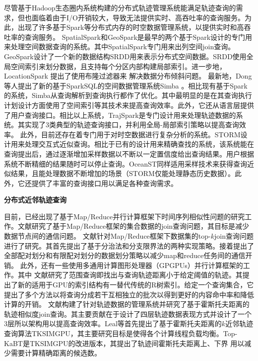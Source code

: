 尽管基于Hadoop生态圈内系统构建的分布式轨迹管理系统能满足轨迹查询的需求，但也面临着由于I/O开销较大，导致无法提供实时、高吞吐率的查询服务。为此，出现了许多基于Spark等分布式内存的时空数据管理系统，以提供实时和高吞吐率的查询服务。
SpatialSpark\cite{SpatialSpark}和GeoSpark\cite{GeoSpark}是最早的两个基于Spark设计的专门用来处理空间数据查询的系统。其中SpatialSpark专门用来出列空间join查询。 GeoSpark设计了一个新的数据结构SRDD用来表示分布式空间数据。SRDD使用全局空间索引来划分数据，且支持每个分区内部构建局部索引。进一步地， LocationSpark\cite{Locationspark} 提出了使用布隆过滤器来 解决数据分布倾斜问题。
最新地，Dong等人提出了新的基于SparkSQL的空间数据管理系统Simba \cite{Simba}。相比现有基于Spark的系统，Simba从查询解析到查询执行都作了优化。其中最明显的是在其查询执行计划设计方面使用了空间索引等其技术来提高查询效率。此外，它还从语言层提供了用户查询接口。相比以上系统，TrajSpark\cite{TrajSpark}是专门设计用来处理轨迹数据的系统。其实现了3类典型的轨迹查询接口，并利用全局-局部索引策略以提高查询效率。
此外，目前还存在着专门用于对时空数据进行复杂分析的系统\cite{OceanST,STORM}。STORM\cite{STORM}设计用来处理交互式近似查询。相比于已有的设计用来精确查找的系统，该系统能在查询提出后，通过逐渐增加采样数据以不断以一定置信度给出查询结果。用户根据系统不断精细的结果随时可以停止查询。OceanST\cite{OceanST}同样适用采样技术来获得查询近似结果，且能处理数据不断增加的场景（STORM仅能处理静态历史数据）。此外，它还提供了丰富的查询接口用以满足各种查询需求。



\textbf{分布式近邻轨迹查询}

目前，已经出现了基于Map/Reduce并行计算框架下时间序列相似性问题的研究工作\cite{kimICDE2012,kimICDE2012}。文献\cite{kimICDE2012}研究了基于Map/Reduce框架的集合数据的join查询问题，其目标是减少数据节点间的通信问题。
文献\cite{kimICDE2012}针对Map/Reduce框架下数据集的top-$k$join查询问题进行了研究。其首先提出了基于分治法和分支限界法的两种实现策略。接着提出了全部配对划分和有限配对划分的数据划分策略以减少map和reduce任务间的通信开销。
此外，还有一些使用多通用计算图形处理器（GPGPUs）并行计算框架的工作\cite{GowanlockC14,Zhang2012U2STRA,LealGZY15}。其中
文献\cite{GowanlockC14}研究了范围查询即找出与查询轨迹距离小于给定阈值的轨迹。其提出了新的适用于GPU的索引结构有一替代传统的R树索引。给定一个查询集合，它提出了多个方法以将查询分成若干互相独立的批次以得到更好的内容命中率和降低计算的开销。
文献\cite{Zhang2012U2STRA}构建了针对轨迹数据的管理系统并研究了基于霍斯托夫距离的轨迹相似度join查询。其主要贡献在于设计了四层轨迹数据表现方式并设计了一个3层所以架构用以提高查询效率。Leal等\cite{LealGZY15}首先提出了基于霍斯托夫距离的$k$近邻轨迹查询算法TKSIMGPU，其主要研究目标是使得各个计算线程负载均衡。Top-KaBT\cite{LealGZY16}是TKSIMGPU的改进版本，其提出了轨迹间霍斯托夫距离上、下界 用以减少需要计算精确距离的候选数。

